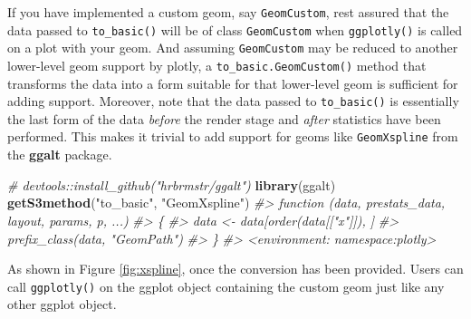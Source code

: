 \documentclass[12pt,]{isuthesis}
\newenvironment{Shaded}{\begin{snugshade}}{\end{snugshade}}
\newcommand{\KeywordTok}[1]{\textcolor[rgb]{0.13,0.29,0.53}{\textbf{{#1}}}}
\newcommand{\StringTok}[1]{\textcolor[rgb]{0.31,0.60,0.02}{{#1}}}
\newcommand{\CommentTok}[1]{\textcolor[rgb]{0.56,0.35,0.01}{\textit{{#1}}}}
\newcommand{\NormalTok}[1]{{#1}}
\begin{document}
If you have implemented a custom geom, say \texttt{GeomCustom}, rest
assured that the data passed to \texttt{to\_basic()} will be of class
\texttt{GeomCustom} when \texttt{ggplotly()} is called on a plot with
your geom. And assuming \texttt{GeomCustom} may be reduced to another
lower-level geom support by plotly, a \texttt{to\_basic.GeomCustom()}
method that transforms the data into a form suitable for that
lower-level geom is sufficient for adding support. Moreover, note that
the data passed to \texttt{to\_basic()} is essentially the last form of
the data \emph{before} the render stage and \emph{after} statistics have
been performed. This makes it trivial to add support for geoms like
\texttt{GeomXspline} from the \textbf{ggalt} package.

\begin{Shaded}
\begin{Highlighting}[]
\CommentTok{# devtools::install_github("hrbrmstr/ggalt")}
\KeywordTok{library}\NormalTok{(ggalt)}
\KeywordTok{getS3method}\NormalTok{(}\StringTok{"to_basic"}\NormalTok{, }\StringTok{"GeomXspline"}\NormalTok{)}
\CommentTok{#> function (data, prestats_data, layout, params, p, ...) }
\CommentTok{#> \{}
\CommentTok{#>     data <- data[order(data[["x"]]), ]}
\CommentTok{#>     prefix_class(data, "GeomPath")}
\CommentTok{#> \}}
\CommentTok{#> <environment: namespace:plotly>}
\end{Highlighting}
\end{Shaded}

As shown in Figure \ref{fig:xspline}, once the conversion has been
provided. Users can call \texttt{ggplotly()} on the ggplot object
containing the custom geom just like any other ggplot object.
\end{document}
